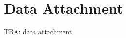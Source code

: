 \documentclass[
    digital,
    color,
    11pt,
    nocover,
    table,  %
    nolof,  %
    nolot,  %
    microtype,
]{fithesis3}
\begin{document}









\printbibliography[heading=bibintoc]

\appendix

%

\chapter{Data Attachment}
\label{chap:data}

TBA: data attachment


\end{document}
